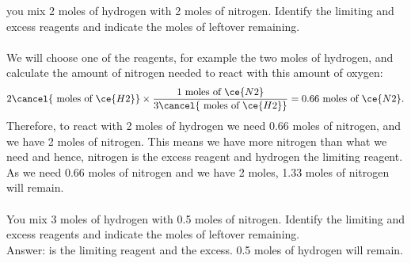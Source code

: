\documentclass[main.tex]{subfiles}
\begin{document}
\begin{description}
\begin{example}
you mix 2 moles of hydrogen with 2 moles of nitrogen. Identify the limiting and excess reagents and indicate the moles of leftover remaining.\\
\\
We will choose one of the reagents, for example the two moles of hydrogen, and calculate the amount of nitrogen needed to react with this amount of oxygen:
\begin{equation*}
2\cancel{\text{ moles of }\ce{H2}} \times \dfrac{\text{1 moles of }\ce{N2}}{3\cancel{\text{ moles of }\ce{H2}}}=0.66\text{ moles of }\ce{N2}.
\end{equation*}
Therefore, to react with 2 moles of hydrogen we need 0.66 moles of nitrogen, and we have 2 moles of nitrogen. This means we have more nitrogen than what we need and hence, nitrogen is the excess reagent and hydrogen the limiting reagent. As we need 0.66 moles of nitrogen and we have 2 moles, 1.33 moles of nitrogen will remain.
\\
\faDiamond\ \\
You mix 3 moles of hydrogen with 0.5 moles of nitrogen. Identify the limiting and excess reagents and indicate the moles of leftover remaining. \\
\flushright Answer:  is the limiting reagent and  the excess. 0.5 moles of hydrogen will remain.
\end{example}%

\end{description}
\end{document}
